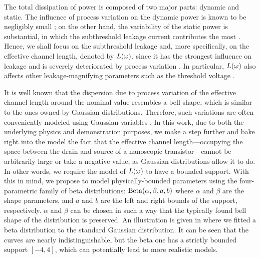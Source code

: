 The total dissipation of power is composed of two major parts: dynamic and static.
The influence of process variation on the dynamic power is known to be negligibly small \cite{srivastava2010, juan2011, juan2012}; on the other hand, the variability of the static power is substantial, in which the subthreshold leakage current contributes the most \cite{juan2011, juan2012}.
Hence, we shall focus on the subthreshold leakage and, more specifically, on the effective channel length, denoted by $L(\omega)$, since it has the strongest influence on leakage and is severely deteriorated by process variation \cite{chandrakasan2001}.
In particular, $L(\omega)$ also affects other leakage-magnifying parameters such as the threshold voltage \cite{juan2011}.

It is well known that the dispersion due to process variation of the effective channel length around the nominal value resembles a bell shape, which is similar to the ones owned by Gaussian distributions.
Therefore, such variations are often conveniently modeled using Gaussian variables \cite{srivastava2010, juan2011, juan2012, chandra2010, shen2009, bhardwaj2006, ghanta2006}.
In this work, due to both the underlying physics and demonstration purposes, we make a step further and bake right into the model the fact that the effective channel length---occupying the space between the drain and source of a nanoscopic transistor---cannot be arbitrarily large or take a negative value, as Gaussian distributions allow it to do.
In other words, we require the model of $L(\omega)$ to have a bounded support.
With this in mind, we propose to model physically-bounded parameters using the four-parametric family of beta distributions: $\text{Beta}(\alpha, \beta, a, b)$ where $\alpha$ and $\beta$ are the shape parameters, and $a$ and $b$ are the left and right bounds of the support, respectively.
$\alpha$ and $\beta$ can be chosen in such a way that the typically found bell shape of the distribution is preserved.
An illustration is given in  where we fitted a beta distribution to the standard Gaussian distribution.
It can be seen that the curves are nearly indistinguishable, but the beta one has a strictly bounded support $[-4, 4]$, which can potentially lead to more realistic models.

